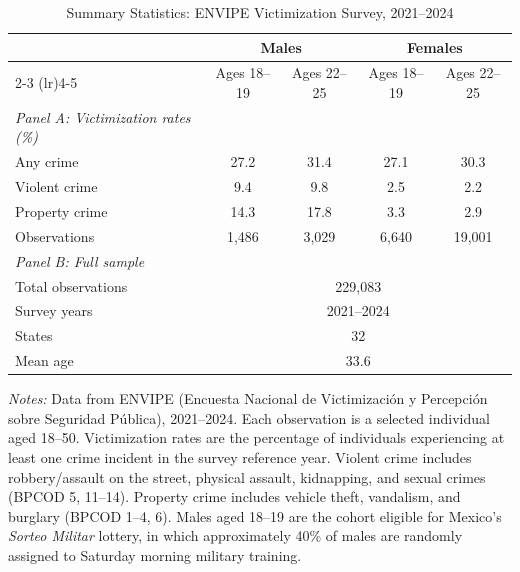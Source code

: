 \begin{table}[t]\begin{threeparttable}
\centering
\caption{Summary Statistics: ENVIPE Victimization Survey, 2021--2024}
\label{tab:summary}
\begin{tabular}{lcccc}
\hline\hline
 & \multicolumn{2}{c}{Males} & \multicolumn{2}{c}{Females} \\
\cmidrule(lr){2-3} \cmidrule(lr){4-5}
 & Ages 18--19 & Ages 22--25 & Ages 18--19 & Ages 22--25 \\
\hline
\addlinespace
\textit{Panel A: Victimization rates (\%)} \\
\addlinespace
Any crime & 27.2 & 31.4 & 27.1 & 30.3 \\
Violent crime & 9.4 & 9.8 & 2.5 & 2.2 \\
Property crime & 14.3 & 17.8 & 3.3 & 2.9 \\
\addlinespace
Observations & 1,486 & 3,029 & 6,640 & 19,001 \\
\addlinespace
\textit{Panel B: Full sample} \\
\addlinespace
Total observations & \multicolumn{4}{c}{229,083} \\
Survey years & \multicolumn{4}{c}{2021--2024} \\
States & \multicolumn{4}{c}{32} \\
Mean age & \multicolumn{4}{c}{33.6} \\
\hline\hline
\end{tabular}
\vspace{0.5em}\begin{tablenotes}[flushleft]
\small
\item \textit{Notes:} Data from ENVIPE (Encuesta Nacional de Victimizaci\'on y Percepci\'on sobre Seguridad P\'ublica), 2021--2024. Each observation is a selected individual aged 18--50. Victimization rates are the percentage of individuals experiencing at least one crime incident in the survey reference year. Violent crime includes robbery/assault on the street, physical assault, kidnapping, and sexual crimes (BPCOD 5, 11--14). Property crime includes vehicle theft, vandalism, and burglary (BPCOD 1--4, 6). Males aged 18--19 are the cohort eligible for Mexico's \textit{Sorteo Militar} lottery, in which approximately 40\% of males are randomly assigned to Saturday morning military training.
\end{tablenotes}
\end{threeparttable}\end{table}

